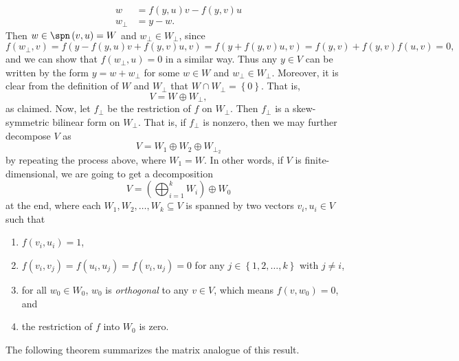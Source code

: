 \documentclass[linearalgebraII]{subfiles}
\begin{document}
\begin{remark}
        \begin{align*}
            w & = f\left( y,u \right) v - f\left( y,v \right) u \\
            w_\perp &= y-w.
        \end{align*} 
        Then $w\in\spn\left( v,u \right) = W$ and $w_\perp\in W_\perp$, since
        \begin{equation*}
            f\left( w_\perp, v \right) = f\left( y-f\left( y,u \right) v + f\left( y,v \right) u, v\right) = f\left( y+f(y,v)u, v \right) = f\left( y,v \right) + f\left( y,v \right) f(u,v) = 0, 
        \end{equation*}
        and we can show that $f\left( w_\perp, u \right) =0$ in a similar way. Thus any $y\in V$ can be written by the form $y = w + w_\perp$ for some $w\in W$ and $w_\perp\in W_\perp$. Moreover, it is clear from the definition of $W$ and $W_\perp$ that $W\cap W_\perp = \left\lbrace 0 \right\rbrace $. That is,
        \begin{equation*}
            V = W\oplus W_\perp,
        \end{equation*}
        as claimed. Now, let $f_\perp$ be the restriction of $f$ on $W_\perp$. Then $f_\perp$ is a skew-symmetric bilinear form on $W_\perp$. That is, if $f_\perp$ is nonzero, then we may further decompose $V$ as
        \begin{equation*}
            V = W_1\oplus W_2\oplus W_{\perp_2}
        \end{equation*}
        by repeating the process above, where $W_1 = W$. In other words, if $V$ is finite-dimensional, we are going to get a decomposition
        \begin{equation*}
            V = \left( \bigoplus^{k}_{i=1} W_i \right) \oplus W_0
        \end{equation*}
        at the end, where each $W_1,W_2, \ldots, W_k\subseteq V$ is spanned by two vectors $v_i, u_i\in V$ such that
        \begin{enumerate}
            \item $f\left( v_i,u_i \right) = 1$,
            \item $f\left( v_i, v_j \right) = f\left( u_i,u_j \right) = f\left( v_i,u_j \right) = 0$ for any $j\in \left\lbrace 1,2,\ldots,k \right\rbrace$ with $j\neq i$, 
            \item for all $w_0\in W_0$, $w_0$ is \textit{orthogonal} to any $v\in V$, which means $f\left( v, w_0 \right) = 0$, and
            \item the restriction of $f$ into $W_0$ is zero.
        \end{enumerate}
        The following theorem summarizes the matrix analogue of this result.
    \end{remark}
\end{document}
